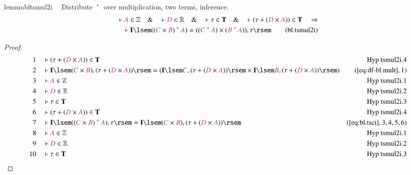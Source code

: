\begin{restatable}{lemma}{bltsmul2i}~~ Distribute $~\string^~$ over
multiplication, two terms, inference.
\begin{align}
\vdash \mc{A} \in \mathbb{Z}\quad\&\quad \vdash \mc{D} \in
    \mathbb{R}\quad\&\quad \vdash \tau \in \mathbf{T}\quad\&\quad \vdash ( \tau
    + ( \mc{D} \times \mc{A} ) ) \in \mathbf{T}\quad\Rightarrow \notag \\ %
     \quad \vdash
    \mathbf{I} \lsem ( ( \mc{C} \times \mc{B} ) ~\string^~ \mc{A} ) = ( ( \mc{C}
    ~\string^~ \mc{A} ) \times ( \mc{B} ~\string^~ \mc{A} ) ) , \tau
    \rsem\label{eq:bl.tsmul2i}\tag{bl.tsmul2i}
\end{align}
\end{restatable}

\begin{proof}
\begin{align}
  1 &&  & \vdash ( \tau + ( \mc{D} \times \mc{A} ) ) \in
      \mathbf{T}&\text{Hyp~tsmul2i.4}\notag%
  \\ 2 &&  & \vdash \mathbf{I} \lsem ( \mc{C} \times \mc{B} ) , ( \tau + (
      \mc{D} \times \mc{A} ) ) \rsem = ( \mathbf{I} \lsem
      \mc{C} , ( \tau + ( \mc{D} \times \mc{A} ) ) \rsem
      \times \mathbf{I} \lsem \mc{B} , ( \tau + ( \mc{D}
      \times \mc{A} ) ) \rsem
      )&(\mbox{\ref{eq:df-bl.mult}},1)\notag
  \\ 3 &&  & \vdash \mc{A} \in
      \mathbb{Z}&\text{Hyp~tsmul2i.1}\notag%
  \\ 4 &&  & \vdash \mc{D} \in
      \mathbb{R}&\text{Hyp~tsmul2i.2}\notag%
  \\ 5 &&  & \vdash \tau \in \mathbf{T}&\text{Hyp~tsmul2i.3}\notag%
  \\ 6 &&  & \vdash ( \tau + ( \mc{D} \times \mc{A} ) ) \in
      \mathbf{T}&\text{Hyp~tsmul2i.4}\notag%
  \\ 7 &&  & \vdash \mathbf{I} \lsem ( ( \mc{C} \times \mc{B} ) ~\string^~
      \mc{A} ) , \tau \rsem = \mathbf{I} \lsem ( \mc{C}
      \times \mc{B} ) , ( \tau + ( \mc{D} \times \mc{A} ) )
      \rsem&(\mbox{\ref{eq:bl.tsci}},3,4,5,6)\notag
  \\ 8 &&  & \vdash \mc{A} \in
      \mathbb{Z}&\text{Hyp~tsmul2i.1}\notag%
  \\ 9 &&  & \vdash \mc{D} \in
      \mathbb{R}&\text{Hyp~tsmul2i.2}\notag%
  \\ 10 &&  & \vdash \tau \in
      \mathbf{T}&\text{Hyp~tsmul2i.3}\notag%

\end{align}
\end{proof}

